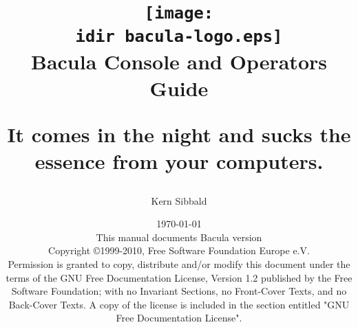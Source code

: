 \documentclass[10pt,a4paper]{book}
\begin{document}
\sloppy

\parskip 10pt
\parindent 0pt

\title{\texttt{[image: \\idir bacula-logo.eps]} \\ \bigskip
  \Huge{Bacula Console and Operators Guide}
  \begin{center}
   \large{It comes in the night and sucks 
          the essence from your computers. }
  \end{center}
}


\author{Kern Sibbald}
\date{\vspace{1.0in}\today \\
      This manual documents Bacula version  \\
      \vspace{0.2in}
      Copyright \copyright 1999-2010, Free Software Foundation Europe
      e.V. \\
      \vspace{0.2in}
  Permission is granted to copy, distribute and/or modify this document under the terms of the
  GNU Free Documentation License, Version 1.2 published by the Free Software Foundation; 
  with no Invariant Sections, no Front-Cover Texts, and no Back-Cover Texts.
  A copy of the license is included in the section entitled "GNU Free Documentation License".
}

\maketitle

\clearpage
\tableofcontents
\clearpage

 




\clearpage
\printindex[general]
\end{document}
